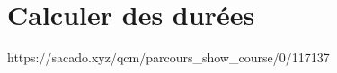 

% 
% 


% 




\chapter{Calculer des durées}
{https://sacado.xyz/qcm/parcours_show_course/0/117137}


